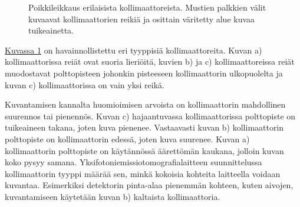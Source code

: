 \begin{figure}[H]
    \centering
    \captionsetup{width=.9\textwidth}
    \begin{subfigure}[t]{.4\textwidth}
        \resizebox{\linewidth}{!}{}
        \caption{}
    \end{subfigure}%
    \hspace{.1\textwidth}%
    \begin{subfigure}[t]{.4\textwidth}
        \resizebox{\linewidth}{!}{}
        \caption{}
    \end{subfigure}
    \begin{subfigure}[b]{.4\textwidth}
        \resizebox{\linewidth}{!}{}
        \caption{}
    \end{subfigure}%
    \hspace{.1\textwidth}%
    \begin{subfigure}[b]{.4\textwidth}
        \resizebox{\linewidth}{!}{}
        \caption{}
    \end{subfigure}
    \caption{Poikkileikkaus erilaisista kollimaattoreista. Mustien palkkien välit kuvaavat kollimaattorien reikiä ja osittain väritetty alue kuvaa tuikeainetta.}
    \label{fig:kollimaattorit}
\end{figure}

\hyperref[fig:kollimaattorit]{Kuvassa \ref*{fig:kollimaattorit}} on havainnollistettu eri tyyppisiä kollimaattoreita. Kuvan a) kollimaattorissa reiät ovat suoria lieriöitä, kuvien b) ja c) kollimaattoreissa reiät muodostavat polttopisteen johonkin pisteeseen kollimaattorin ulkopuolelta ja kuvan c) kollimaattorissa on vain yksi reikä.

Kuvantamisen kannalta huomioimisen arvoista on kollimaattorin mahdollinen suurennos tai pienennös. Kuvan c) hajaantuvassa kollimaattorissa polttopiste on tuikeaineen takana, joten kuva pienenee. Vastaavasti kuvan b) kollimaattorin polttopiste on kollimaattorin edessä, joten kuva suurenee. Kuvan a) kollimaattorin polttopiste on käytännössä äärettömän kaukana, jolloin kuvan koko pysyy samana.\cite{cherry_gamma_2012, van_audenhaege_review_2015} Yksifotoniemissiotomografialaitteen suunnittelussa kollimaattorin tyyppi määrää sen, minkä kokoisia kohteita laitteella voidaan kuvantaa. Esimerkiksi detektorin pinta-alaa pienemmän kohteen, kuten aivojen, kuvantamiseen käytetään kuvan b) kaltaista kollimaattoria\cite{van_audenhaege_review_2015, cherry_single_2012}.

